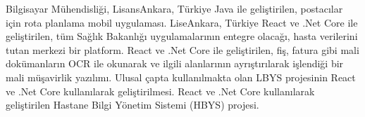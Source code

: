 \documentclass[
    10pt,
    A4,
    english,
    draft = false,
    twoside = false,
]{article}
\begin{document}

	{Bilgisayar Mühendisliği, Lisans}{Ankara, Türkiye}
    {
      {Java ile geliştirilen, postacılar için rota planlama mobil uygulaması.}
    }
	{Lise}{Ankara, Türkiye}{}
    {
      {React ve .Net Core ile geliştirilen, tüm Sağlık Bakanlığı uygulamalarının entegre olacağı, hasta verilerini tutan merkezi bir platform.}
      {React ve .Net Core ile geliştirilen, fiş, fatura gibi mali dokümanların OCR ile okunarak  ve ilgili alanlarının ayrıştırılarak işlendiği bir mali müşavirlik yazılımı.}
    }
    {
      {Ulusal çapta kullanılmakta olan LBYS projesinin React ve .Net Core kullanılarak geliştirilmesi.}
      {React ve .Net Core kullanılarak geliştirilen Hastane Bilgi Yönetim Sistemi (HBYS) projesi.}
    }
\end{document}
